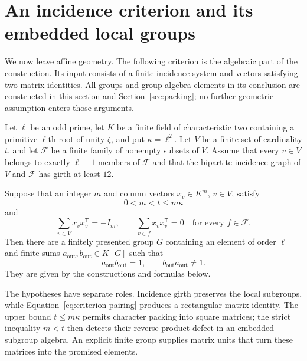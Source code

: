 \section{An incidence criterion and its embedded local groups}
\label{sec:criterion}

We now leave affine geometry. The following criterion is the algebraic part of the construction. Its
input consists of a finite incidence system and vectors satisfying two
matrix identities. All groups and group-algebra elements in its conclusion
are constructed in this section and Section~\ref{sec:packing}; no further geometric assumption enters those arguments.

\begin{theorem}
\label{thm:criterion}
Let $\ell$ be an odd prime, let $K$ be a finite field of characteristic two
containing a primitive $\ell$th root of unity $\zeta$, and put
$\kappa=\ell^2$. Let $V$ be a finite set of cardinality $t$, and let
$\mathcal F$ be a finite family of nonempty subsets of $V$. Assume that
every $v\in V$ belongs to exactly $\ell+1$ members of $\mathcal F$ and
that the bipartite incidence graph of $V$ and $\mathcal F$ has girth at
least $12$.

Suppose that an integer $m$ and column vectors $x_v\in K^m$, $v\in V$,
satisfy
\begin{equation}
\label{eq:criterion-size}
0<m<t\le m\kappa
\end{equation}
and
\begin{equation}
\label{eq:criterion-pairing}
\sum_{v\in V}x_vx_v^{\mathsf T}=-I_m,
\qquad
\sum_{v\in f}x_vx_v^{\mathsf T}=0
\quad\text{for every }f\in\mathcal F.
\end{equation}
Then there are a finitely presented group $G$ containing an element of order $\ell$ and finite sums
$a_{\mathrm{out}},b_{\mathrm{out}}\in K[G]$ such that
\[
a_{\mathrm{out}}b_{\mathrm{out}}=1,
\qquad
b_{\mathrm{out}}a_{\mathrm{out}}\ne1.
\]
They are given by the constructions and formulas below.
\end{theorem}

The hypotheses have separate roles. Incidence girth preserves the local
subgroups, while Equation~\eqref{eq:criterion-pairing} produces a
rectangular matrix identity. The upper bound $t\le m\kappa$ permits
character packing into square matrices; the strict inequality $m<t$
then detects their reverse-product defect in an embedded subgroup algebra.
An explicit finite group supplies matrix units that turn these matrices
into the promised elements.


